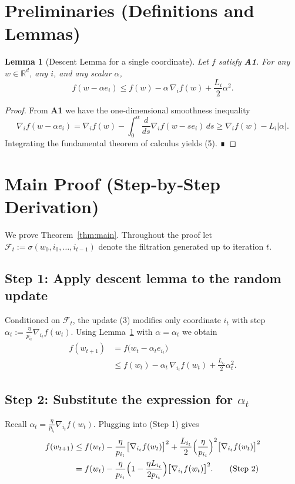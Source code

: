\documentclass{article}
\newcommand{\RR}{\mathbb{R}}
\newtheorem{lemma}{Lemma}
\begin{document}
\newpage
\section*{Preliminaries (Definitions and Lemmas)}
\begin{lemma}[Descent Lemma for a single coordinate]\label{lem:descent}
Let $f$ satisfy \textbf{A1}. For any $w\in\RR^{d}$, any $i$, and any scalar $\alpha$,
\[
f(w-\alpha e_i)\le f(w)-\alpha\,\nabla_i f(w)+\frac{L_i}{2}\alpha^{2}.
\tag{5}
\]
\end{lemma}
\begin{proof}
From \textbf{A1} we have the one‑dimensional smoothness inequality
\[
\nabla_i f(w-\alpha e_i)
= \nabla_i f(w)-\int_{0}^{\alpha} \frac{d}{ds}\nabla_i f(w-s e_i)\,ds
\ge \nabla_i f(w)-L_i|\alpha|.
\]
Integrating the fundamental theorem of calculus yields (5).  ∎
\end{proof}

\section*{Main Proof (Step‑by‑Step Derivation)}
We prove Theorem~\ref{thm:main}.  Throughout the proof let $\mathcal{F}_t:=\sigma(w_0,i_0,\dots,i_{t-1})$ denote the filtration generated up to iteration $t$.

\subsection*{Step 1: Apply descent lemma to the random update}
Conditioned on $\mathcal{F}_t$, the update (3) modifies only coordinate $i_t$ with step
$\alpha_t:=\frac{\eta}{p_{i_t}}\nabla_{i_t}f(w_t)$.  Using Lemma~\ref{lem:descent} with $\alpha=\alpha_t$ we obtain
\begin{align}
f(w_{t+1})
&=f\!\bigl(w_t-\alpha_t e_{i_t}\bigr) \nonumber\\
&\le f(w_t)-\alpha_t\,\nabla_{i_t}f(w_t)
      +\frac{L_{i_t}}{2}\alpha_t^{2}.
\tag{Step 1}
\end{align}

\subsection*{Step 2: Substitute the expression for $\alpha_t$}
Recall $\alpha_t=\frac{\eta}{p_{i_t}}\nabla_{i_t}f(w_t)$.  Plugging into (Step 1) gives
\begin{align}
f(w_{t+1})
&\le f(w_t)-\frac{\eta}{p_{i_t}}\bigl[\nabla_{i_t}f(w_t)\bigr]^2
      +\frac{L_{i_t}}{2}\Bigl(\frac{\eta}{p_{i_t}}\Bigr)^{2}
        \bigl[\nabla_{i_t}f(w_t)\bigr]^2 \nonumber\\
&= f(w_t)-\frac{\eta}{p_{i_t}}\Bigl(1-\frac{\eta L_{i_t}}{2p_{i_t}}\Bigr)
      \bigl[\nabla_{i_t}f(w_t)\bigr]^2 .
\tag{Step 2}
\end{align}
\end{document}

